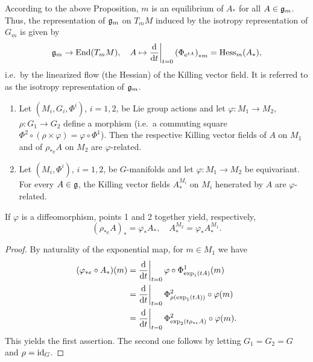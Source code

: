\begin{rem}
    According to the above Proposition, $m$ is an equilibrium of $A_\ast$ for all $A\in\mathfrak{g}_m$. Thus, the representation of $\mathfrak{g}_m$ on $T_mM$ induced by the isotropy representation of $G_m$ is given by
    \[\frakg_m\to \End(T_mM),\quad A\mapsto \restr{\frac{\dd}{\dd t}}{t=0} \left(\Phi_{\rme^{tA}}\right)_{\ast m}=\mathrm{Hess}_m(A_\ast),\]
    i.e.~by the linearized flow (the Hessian) of the Killing vector field. It is referred to as the isotropy representation of $\mathfrak{g}_m$.
\end{rem}

\begin{prop}\label{prop 6.2.4 RS1}
    \begin{enumerate}
        \item Let $(M_i,G_i,\Phi^i)$, $i=1,2$, be Lie group actions and let $\varphi:M_1\to M_2$, $\rho:G_1\to G_2$ define a morphism (i.e.~a commuting square $\Phi^2\circ(\rho\times\varphi)=\varphi\circ\Phi^1$). Then the respective Killing vector fields of $A$ on $M_1$ and of $\rho_{\ast e} A$ on $M_2$ are $\varphi$-related.
        \item Let $(M_i,\Phi^i)$, $i=1,2$, be $G$-manifolds and let $\varphi:M_1\to M_2$ be equivariant. For every $A\in\mathfrak{g}$, the Killing vector fields $A_\ast^{M_i}$ on $M_i$ henerated by $A$ are $\varphi$-related.
    \end{enumerate}
    If $\varphi$ is a diffeomorphism, points 1 and 2 together yield, respectively,
    \[\left(\rho_{\ast e}A\right)_\ast=\varphi_{\ast}A_\ast,\quad A_\ast^{M_2}=\varphi_\ast A_\ast^{M_1}.\]
\end{prop}
\begin{proof}
    By naturality of the exponential map, for $m\in M_1$ we have
    \begin{align}
        (\varphi_{\ast e}\circ A_\ast)(m)&=\restr{\frac{\dd}{\dd t}}{t=0} \varphi\circ \Phi^1_{\exp_1(tA)}(m)\\
        &=\restr{\frac{\dd}{\dd t}}{t=0} \Phi^2_{\rho(\exp_1(tA))}\circ\varphi(m)\\
        &=\restr{\frac{\dd}{\dd t}}{t=0}\Phi^2_{\exp_2(t\rho_{\ast e}A)}\circ\varphi(m).
    \end{align}
    This yields the first assertion. The second one follows by letting $G_1=G_2=G$ and $\rho=\operatorname{id}_G$.
\end{proof}

